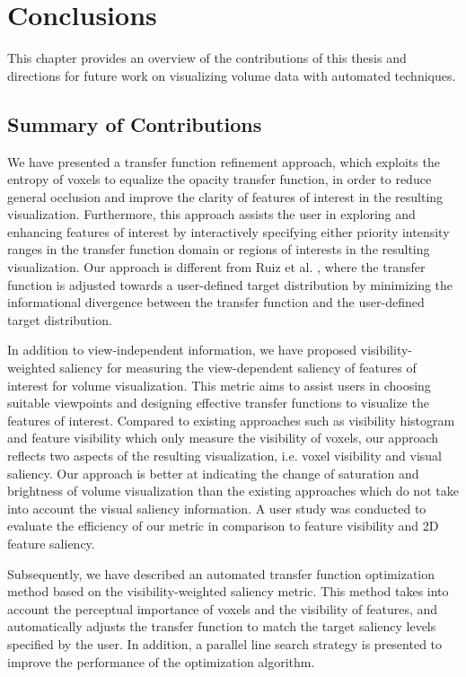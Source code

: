 \chapter{Conclusions \label{conclusions}}

This chapter provides an overview of the contributions of this thesis and directions for future work on visualizing volume data with automated techniques.

\section{Summary of Contributions}
We have presented a transfer function refinement approach, which exploits the entropy of voxels to equalize the opacity transfer function, in order to reduce general occlusion and improve the clarity of features of interest in the resulting visualization.
Furthermore, this approach assists the user in exploring and enhancing features of interest by interactively specifying either priority intensity ranges in the transfer function domain or regions of interests in the resulting visualization.
Our approach is different from Ruiz et al. \cite{ruiz_automatic_2011}, where the transfer function is adjusted towards a user-defined target distribution by minimizing the informational divergence between the transfer function and the user-defined target distribution.

In addition to view-independent information, we have proposed visibility-weighted saliency for measuring the view-dependent saliency of features of interest for volume visualization.
This metric aims to assist users in choosing suitable viewpoints and designing effective transfer functions to visualize the features of interest.
Compared to existing approaches such as visibility histogram \cite{correa_visibility_2011} and feature visibility \cite{wang_efficient_2011} which only measure the visibility of voxels, our approach reflects two aspects of the resulting visualization, i.e. voxel visibility and visual saliency. Our approach is better at indicating the change of saturation and brightness of volume visualization than the existing approaches which do not take into account the visual saliency information. A user study was conducted to evaluate the efficiency of our metric in comparison to feature visibility and 2D feature saliency.

Subsequently, we have described an automated transfer function optimization method based on the visibility-weighted saliency metric. This method takes into account the perceptual importance of voxels and the visibility of features, and automatically adjusts the transfer function to match the target saliency levels specified by the user. In addition, a parallel line search strategy is presented to improve the performance of the optimization algorithm.

